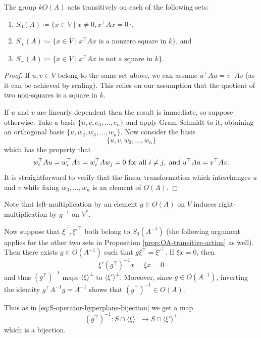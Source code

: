 \begin{prop}\label{prop:OA-transitive-action}
	The group $kO(A)$ acts transitively on each of the following sets:
	\begin{enumerate}
		\item $S_0(A) \coloneqq \{x \in V \mid x\neq 0, x^\top A x = 0\}$,
		\item $S_+(A) \coloneqq \{ x\in V \mid x^\top A x \text{ is a nonzero square in } k\}$, and
		\item $S_-(A) \coloneqq \{ x\in V \mid x^\top A x \text{ is not a square in } k\}$.
	\end{enumerate}
\end{prop}
\begin{proof}
	If $u,v\in V$ belong to the same set above, we can assume $u^\top A u = v^\top A v$ (as it can be achieved by scaling). This relies on our assumption that the quotient of two non-squares is a square in $k$.
	
	If $u$ and $v$ are linearly dependent then the result is immediate, so suppose otherwise. Take a basis $\{u,v,e_3,\ldots,e_n\}$ and apply Gram-Schmidt to it, obtaining an orthogonal basis $\{u, w_2, w_3, \ldots,w_n\}$. Now consider the basis
	\[
		\{u,v,w_3,\ldots,w_n\}
	\]
	which has the property that
	\[
		w_i^\top A u = w_i^\top A v = w_i^\top A w_j = 0 \text{ for all } i \neq j, \text{ and }\\
		u^\top A u = v^\top A v.
	\]
	It is straightforward to verify that the linear transformation which interchanges $u$ and $v$ while fixing $w_3,\ldots,w_n$ is an element of $O(A)$.
\end{proof}

Note that left-multiplication by an element $g \in O(A)$ on $V$ induces right-multiplication by $g^{-1}$ on $V^*$.

Now suppose that $\xi^\top,\xi'^\top$ both belong to $S_0(A^{-1})$ (the following argument applies for the other two sets in Proposition \ref{prop:OA-transitive-action} as well). Then there exists $g \in O(A^{-1})$ such that $g \xi^\top = \xi'^\top$. If $\xi x = 0$, then
\[
	\xi' (g^\top)^{-1} x = \xi x = 0
\]
and thus $(g^\top)^{-1}$ maps $\langle \xi \rangle^\bot$ to $\langle \xi' \rangle^\bot$. Moreover, since $g \in O(A^{-1})$, inverting the identity $g^\top A^{-1} g = A^{-1}$ shows that $(g^\top)^{-1} \in O(A)$.

Thus as in \eqref{eq:S-operator-hyperplane-bijection} we get a map
\[
	(g^\top)^{-1} \colon S \cap \langle \xi \rangle^\bot \to S \cap \langle \xi' \rangle^\bot
\]
which is a bijection.

